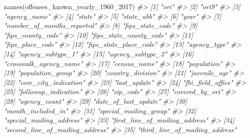 \documentclass[
]{krantz}
\makeatletter
\newenvironment{Shaded}{\begin{snugshade}}{\end{snugshade}}
\newcommand{\CommentTok}[1]{\textcolor[rgb]{0.37,0.37,0.37}{\textit{#1}}}
\newcommand{\FunctionTok}[1]{\textcolor[rgb]{0,0,0}{#1}}
\newcommand{\NormalTok}[1]{#1}
\newenvironment{kframe}{%
\medskip{}
\setlength{\fboxsep}{.8em}
 \def\at@end@of@kframe{}%
 \ifinner\ifhmode%
  \def\at@end@of@kframe{\end{minipage}}%
  \begin{minipage}{\columnwidth}%
 \fi\fi%
 \def\FrameCommand##1{\hskip\@totalleftmargin \hskip-\fboxsep
 \colorbox{shadecolor}{##1}\hskip-\fboxsep
     \hskip-\linewidth \hskip-\@totalleftmargin \hskip\columnwidth}%
 \MakeFramed {\advance\hsize-\width
   \@totalleftmargin\z@ \linewidth\hsize
   \@setminipage}}%
 {\par\unskip\endMakeFramed%
 \at@end@of@kframe}
\renewenvironment{Shaded}{\begin{kframe}}{\end{kframe}}
\makeatother
\begin{document}
\begin{Shaded}
\begin{Highlighting}[]
\FunctionTok{names}\NormalTok{(offenses\_known\_yearly\_1960\_2017)}
\CommentTok{\#\textgreater{}   [1] "ori"                           }
\CommentTok{\#\textgreater{}   [2] "ori9"                          }
\CommentTok{\#\textgreater{}   [3] "agency\_name"                   }
\CommentTok{\#\textgreater{}   [4] "state"                         }
\CommentTok{\#\textgreater{}   [5] "state\_abb"                     }
\CommentTok{\#\textgreater{}   [6] "year"                          }
\CommentTok{\#\textgreater{}   [7] "number\_of\_months\_reported"     }
\CommentTok{\#\textgreater{}   [8] "fips\_state\_code"               }
\CommentTok{\#\textgreater{}   [9] "fips\_county\_code"              }
\CommentTok{\#\textgreater{}  [10] "fips\_state\_county\_code"        }
\CommentTok{\#\textgreater{}  [11] "fips\_place\_code"               }
\CommentTok{\#\textgreater{}  [12] "fips\_state\_place\_code"         }
\CommentTok{\#\textgreater{}  [13] "agency\_type"                   }
\CommentTok{\#\textgreater{}  [14] "agency\_subtype\_1"              }
\CommentTok{\#\textgreater{}  [15] "agency\_subtype\_2"              }
\CommentTok{\#\textgreater{}  [16] "crosswalk\_agency\_name"         }
\CommentTok{\#\textgreater{}  [17] "census\_name"                   }
\CommentTok{\#\textgreater{}  [18] "population"                    }
\CommentTok{\#\textgreater{}  [19] "population\_group"              }
\CommentTok{\#\textgreater{}  [20] "country\_division"              }
\CommentTok{\#\textgreater{}  [21] "juvenile\_age"                  }
\CommentTok{\#\textgreater{}  [22] "core\_city\_indication"          }
\CommentTok{\#\textgreater{}  [23] "last\_update"                   }
\CommentTok{\#\textgreater{}  [24] "fbi\_field\_office"              }
\CommentTok{\#\textgreater{}  [25] "followup\_indication"           }
\CommentTok{\#\textgreater{}  [26] "zip\_code"                      }
\CommentTok{\#\textgreater{}  [27] "covered\_by\_ori"                }
\CommentTok{\#\textgreater{}  [28] "agency\_count"                  }
\CommentTok{\#\textgreater{}  [29] "date\_of\_last\_update"           }
\CommentTok{\#\textgreater{}  [30] "month\_included\_in"             }
\CommentTok{\#\textgreater{}  [31] "special\_mailing\_group"         }
\CommentTok{\#\textgreater{}  [32] "special\_mailing\_address"       }
\CommentTok{\#\textgreater{}  [33] "first\_line\_of\_mailing\_address" }
\CommentTok{\#\textgreater{}  [34] "second\_line\_of\_mailing\_address"}
\CommentTok{\#\textgreater{}  [35] "third\_line\_of\_mailing\_address" }

\end{Highlighting}
\end{Shaded}
\end{document}
